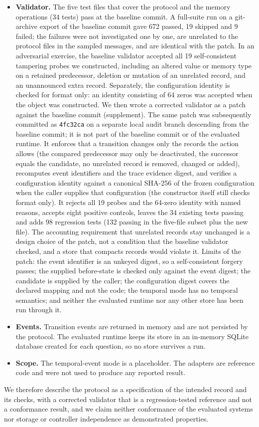\begin{itemize}
\item \textbf{Validator.} The five test files that cover the protocol and the memory operations (34 tests) pass at the baseline commit. A full-suite run on a git-archive export of the baseline commit gave 672 passed, 19 skipped and 9 failed; the failures were not investigated one by one, are unrelated to the protocol files in the sampled messages, and are identical with the patch. In an adversarial exercise, the baseline validator accepted all 19 self-consistent tampering probes we constructed, including an altered value or memory type on a retained predecessor, deletion or mutation of an unrelated record, and an unannounced extra record. Separately, the configuration identity is checked for format only: an identity consisting of 64 zeros was accepted when the object was constructed. We then wrote a corrected validator as a patch against the baseline commit (supplement). The same patch was subsequently committed as \texttt{4fc32ca} on a separate local audit branch descending from the baseline commit; it is not part of the baseline commit or of the evaluated runtime. It enforces that a transition changes only the records the action allows (the compared predecessor may only be deactivated, the successor equals the candidate, no unrelated record is removed, changed or added), recomputes event identifiers and the trace evidence digest, and verifies a configuration identity against a canonical SHA-256 of the frozen configuration when the caller supplies that configuration (the constructor itself still checks format only). It rejects all 19 probes and the 64-zero identity with named reasons, accepts eight positive controls, leaves the 34 existing tests passing and adds 98 regression tests (132 passing in the five-file subset plus the new file). The accounting requirement that unrelated records stay unchanged is a design choice of the patch, not a condition that the baseline validator checked, and a store that compacts records would violate it. Limits of the patch: the event identifier is an unkeyed digest, so a self-consistent forgery passes; the supplied before-state is checked only against the event digest; the candidate is supplied by the caller; the configuration digest covers the declared mapping and not the code; the temporal mode has no temporal semantics; and neither the evaluated runtime nor any other store has been run through it.
\item \textbf{Events.} Transition events are returned in memory and are not persisted by the protocol. The evaluated runtime keeps its store in an in-memory SQLite database created for each question, so no store survives a run.
\item \textbf{Scope.} The temporal-event mode is a placeholder. The adapters are reference code and were not used to produce any reported result.
\end{itemize}
We therefore describe the protocol as a specification of the intended record and its checks, with a corrected validator that is a regression-tested reference and not a conformance result, and we claim neither conformance of the evaluated systems nor storage or controller independence as demonstrated properties.
